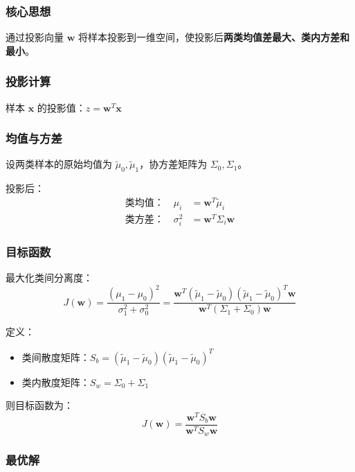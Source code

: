 \documentclass[12pt,a4paper]{ctexart}
\begin{document}
\subsubsection{核心思想}

通过投影向量 $\mathbf{w}$ 将样本投影到一维空间，使投影后\textbf{两类均值差最大、类内方差和最小}。

\subsubsection{投影计算}

样本 $\mathbf{x}$ 的投影值：$z = \mathbf{w}^T\mathbf{x}$

\subsubsection{均值与方差}

设两类样本的原始均值为 $\tilde{\mu}_0, \tilde{\mu}_1$，协方差矩阵为 $\Sigma_0, \Sigma_1$。

投影后：
\begin{align}
\text{类均值：} \quad \mu_i &= \mathbf{w}^T\tilde{\mu}_i \\
\text{类方差：} \quad \sigma_i^2 &= \mathbf{w}^T\Sigma_i\mathbf{w}
\end{align}

\subsubsection{目标函数}

最大化类间分离度：
\[
J(\mathbf{w}) = \frac{(\mu_1 - \mu_0)^2}{\sigma_1^2 + \sigma_0^2} = \frac{\mathbf{w}^T(\tilde{\mu}_1 - \tilde{\mu}_0)(\tilde{\mu}_1 - \tilde{\mu}_0)^T\mathbf{w}}{\mathbf{w}^T(\Sigma_1 + \Sigma_0)\mathbf{w}}
\]

定义：
\begin{itemize}
    \item 类间散度矩阵：$S_b = (\tilde{\mu}_1 - \tilde{\mu}_0)(\tilde{\mu}_1 - \tilde{\mu}_0)^T$
    \item 类内散度矩阵：$S_w = \Sigma_0 + \Sigma_1$
\end{itemize}

则目标函数为：
\[
J(\mathbf{w}) = \frac{\mathbf{w}^TS_b\mathbf{w}}{\mathbf{w}^TS_w\mathbf{w}}
\]

\subsubsection{最优解}
\end{document}
